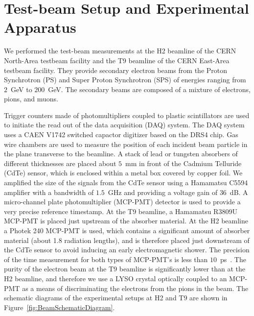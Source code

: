 \section{Test-beam Setup and Experimental Apparatus }
\label{sec:tbeam}

We performed the test-beam measurements at the H2 beamline of the CERN North-Area testbeam facility
and the T9 beamline of the CERN East-Area testbeam facility. They provide secondary electron beams 
from the Proton Synchrotron (PS) and Super Proton Synchrotron (SPS)
of energies ranging from $2$~GeV to $200$~GeV. The secondary beams are composed of 
a mixture of electrons, pions, and muons. 

Trigger counters made of photomultipliers coupled to plastic scintillators are used 
to initiate the read out of the data acquisition (DAQ) system. The DAQ system
uses a CAEN V1742 switched capactor digitizer based on the DRS4 chip. Gas wire chambers
are used to measure the position of each incident beam particle in the plane transverse
to the beamline. A stack of lead or tungsten absorbers of different thicknesses are 
placed about $5$~mm in front of the Cadmium Telluride (CdTe) sensor, which is 
enclosed within a metal box covered by copper foil. We amplified the size of the
signals from the CdTe sensor using a Hamamatsu C5594 amplifier with a bandwidth of
$1.5$~GHz and providing a voltage gain of $36$~dB. A micro-channel plate photomultiplier (MCP-PMT)
detector is used to provide a very precise reference timestamp. At the T9 beamline,
a Hamamatsu R3809U MCP-PMT is placed just upstream of the absorber material. 
At the H2 beamline a Photek 240 MCP-PMT is used, which contains a significant 
amount of absorber material (about 1.8 radiation lengths), and is therefore placed 
just downstream of the CdTe sensor to avoid inducing an early electromagnetic shower.
The precision of the time measurement for both types of MCP-PMT's is less than 
$10$~ps~\cite{Ronzhin2015288}. The purity of the electron beam at the T9 beamline is
significantly lower than at the H2 beamline, and therefore we use a LYSO crystal
optically coupled to an MCP-PMT as a means of discriminating the electrons from the pions
in the beam. The schematic diagrams of the experimental setups at H2 and T9 
are shown in Figure~\ref{fig:BeamSchematicDiagram}. 


